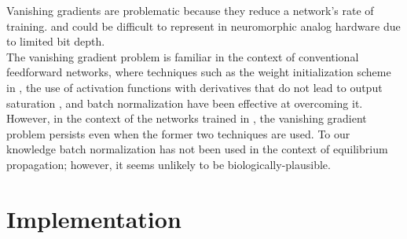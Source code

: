 \documentclass[utf8]{frontiersSCNS}
\newcommand{\npar}{\\\indent}
\begin{document}
Vanishing gradients are problematic because they reduce a network's rate of training. and could be difficult to represent in neuromorphic analog hardware due to limited bit depth.
\npar
The vanishing gradient problem is familiar in the context of conventional feedforward networks, where techniques such as the weight initialization scheme in \cite{glorot2010}, the use of activation functions with derivatives that do not lead to output saturation \cite{schmidhuber2015}, and batch normalization \cite{ioffe2015} have been effective at overcoming it. However, in the context of the networks trained in \cite{scellier17}, the vanishing gradient problem persists even when the former two techniques are used. To our knowledge batch normalization has not been used in the context of equilibrium propagation; however, it seems unlikely to be biologically-plausible.

\section{Implementation}
\label{sec:implementation}
\end{document}
